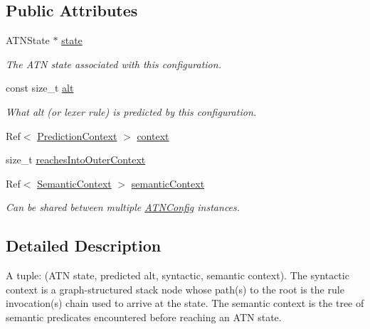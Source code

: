 \subsection*{Public Attributes}
\begin{DoxyCompactItemize}
\item 
\mbox{\label{classantlr4_1_1atn_1_1ATNConfig_ae2e2757839f60f245b1a30c1f83bd52d}} 
A\+T\+N\+State $\ast$ \hyperlink{classantlr4_1_1atn_1_1ATNConfig_ae2e2757839f60f245b1a30c1f83bd52d}{state}
\begin{DoxyCompactList}\small\item\em The A\+TN state associated with this configuration. \end{DoxyCompactList}\item 
\mbox{\label{classantlr4_1_1atn_1_1ATNConfig_ab4b68e6c1b1c70197a21fd62009bf9b8}} 
const size\+\_\+t \hyperlink{classantlr4_1_1atn_1_1ATNConfig_ab4b68e6c1b1c70197a21fd62009bf9b8}{alt}
\begin{DoxyCompactList}\small\item\em What alt (or lexer rule) is predicted by this configuration. \end{DoxyCompactList}\item 
Ref$<$ \hyperlink{classantlr4_1_1atn_1_1PredictionContext}{Prediction\+Context} $>$ \hyperlink{classantlr4_1_1atn_1_1ATNConfig_a1f30878a632f67672f16b52eefb01f26}{context}
\item 
size\+\_\+t \hyperlink{classantlr4_1_1atn_1_1ATNConfig_a3dda5924725f5c1cb7d798dea4b4fca7}{reaches\+Into\+Outer\+Context}
\item 
\mbox{\label{classantlr4_1_1atn_1_1ATNConfig_a99d4da95eab2009d3f0605aa8c051092}} 
Ref$<$ \hyperlink{classantlr4_1_1atn_1_1SemanticContext}{Semantic\+Context} $>$ \hyperlink{classantlr4_1_1atn_1_1ATNConfig_a99d4da95eab2009d3f0605aa8c051092}{semantic\+Context}
\begin{DoxyCompactList}\small\item\em Can be shared between multiple \hyperlink{classantlr4_1_1atn_1_1ATNConfig}{A\+T\+N\+Config} instances. \end{DoxyCompactList}\end{DoxyCompactItemize}


\subsection{Detailed Description}
A tuple\+: (A\+TN state, predicted alt, syntactic, semantic context). The syntactic context is a graph-\/structured stack node whose path(s) to the root is the rule invocation(s) chain used to arrive at the state. The semantic context is the tree of semantic predicates encountered before reaching an A\+TN state. 



